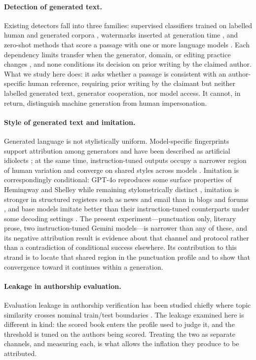 \documentclass[11pt]{article}
\begin{document}
\paragraph{Detection of generated text.}
Existing detectors fall into three families: supervised classifiers trained
on labelled human and generated corpora \cite{ippolito2020,uchendu2021},
watermarks inserted at generation time \cite{kirchenbauer2023}, and
zero-shot methods that score a passage with one or more language models
\cite{mitchell2023,hans2024}.  Each dependency limits transfer when the
generator, domain, or editing practice changes \cite{sadasivan2024}, and
none conditions its decision on prior writing by the claimed author. What we study here does:
it asks whether a passage is
consistent with an author-specific human reference, requiring prior writing
by the claimant but neither labelled generated text, generator cooperation,
nor model access.  It cannot, in return, distinguish machine generation from
human impersonation.

\paragraph{Style of generated text and imitation.}
Generated language is not stylistically uniform.  Model-specific
fingerprints support attribution among generators \cite{bitton2025,rao2025}
and have been described as artificial idiolects \cite{rudnicka2025}; at the
same time, instruction-tuned outputs occupy a narrower region of human
variation and converge on shared styles across models
\cite{milicka2025,reinhart2025}.  Imitation is correspondingly conditional:
GPT-4o reproduces some surface properties of Hemingway and Shelley while
remaining stylometrically distinct \cite{mikros2025}, imitation is stronger
in structured registers such as news and email than in blogs and forums
\cite{wang2025}, and base models imitate better than their instruction-tuned
counterparts under some decoding settings \cite{milicka2025}.  The present
experiment---punctuation only, literary prose, two instruction-tuned Gemini
models---is narrower than any of these, and its negative attribution result
is evidence about that channel and protocol rather than a contradiction of
conditional success elsewhere.  Its contribution to this strand is to
locate that shared region in the punctuation profile and to show that
convergence toward it continues within a generation.

\paragraph{Leakage in authorship evaluation.}
Evaluation leakage in authorship verification has been studied chiefly
where topic similarity crosses nominal train/test boundaries
\cite{sawatphol2024}.
The leakage examined here is different in kind: the scored book enters the
profile used to judge it, and the threshold is tuned on the authors being
scored.  Treating the two as separate channels, and measuring each, is what
allows the inflation they produce to be attributed.
\end{document}
